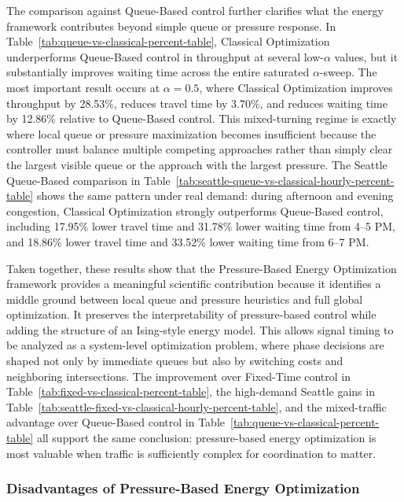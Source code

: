\documentclass[12pt]{article}
\begin{document}
The comparison against Queue-Based control further clarifies what the energy framework contributes beyond simple queue or pressure response. In Table~\ref{tab:queue-vs-classical-percent-table}, Classical Optimization underperforms Queue-Based control in throughput at several low-$\alpha$ values, but it substantially improves waiting time across the entire saturated $\alpha$-sweep. The most important result occurs at $\alpha=0.5$, where Classical Optimization improves throughput by 28.53\%, reduces travel time by 3.70\%, and reduces waiting time by 12.86\% relative to Queue-Based control. This mixed-turning regime is exactly where local queue or pressure maximization becomes insufficient because the controller must balance multiple competing approaches rather than simply clear the largest visible queue or the approach with the largest pressure. The Seattle Queue-Based comparison in Table~\ref{tab:seattle-queue-vs-classical-hourly-percent-table} shows the same pattern under real demand: during afternoon and evening congestion, Classical Optimization strongly outperforms Queue-Based control, including 17.95\% lower travel time and 31.78\% lower waiting time from 4--5 PM, and 18.86\% lower travel time and 33.52\% lower waiting time from 6--7 PM.

Taken together, these results show that the Pressure-Based Energy Optimization framework provides a meaningful scientific contribution because it identifies a middle ground between local queue and pressure heuristics and full global optimization. It preserves the interpretability of pressure-based control while adding the structure of an Ising-style energy model. This allows signal timing to be analyzed as a system-level optimization problem, where phase decisions are shaped not only by immediate queues but also by switching costs and neighboring intersections. The improvement over Fixed-Time control in Table~\ref{tab:fixed-vs-classical-percent-table}, the high-demand Seattle gains in Table~\ref{tab:seattle-fixed-vs-classical-hourly-percent-table}, and the mixed-traffic advantage over Queue-Based control in Table~\ref{tab:queue-vs-classical-percent-table} all support the same conclusion: pressure-based energy optimization is most valuable when traffic is sufficiently complex for coordination to matter.

\subsubsection{Disadvantages of Pressure-Based Energy Optimization}
\end{document}
